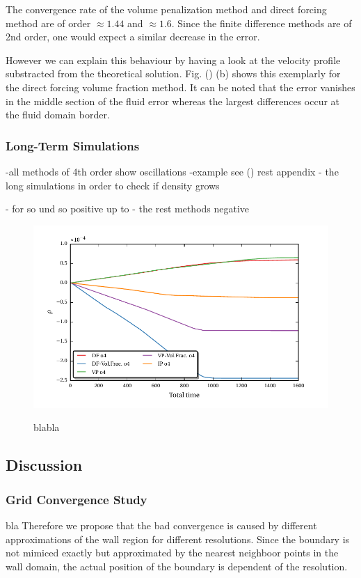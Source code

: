 The convergence rate of the volume penalization method and direct forcing method are of order $\approx 1.44$ and $\approx 1.6$.
Since the finite difference methods are of 2nd order, one would expect a similar decrease in the error.

However we can explain this behaviour by having a look at the velocity profile substracted from the theoretical solution.
Fig. () (b) shows this exemplarly for the direct forcing volume fraction method. It can be noted that
the error vanishes in the middle section of the fluid error whereas the largest differences occur at the fluid domain border.


\subsubsection{Long-Term Simulations}

-all methods of 4th order show oscillations
-example see () rest appendix
- the long simulations in order to check if density grows

- for so und so positive up to
- the rest methods negative



\begin{figure}
  \centering
  \includegraphics{gfx/immersed_boundary/hpflow/long/ts.pdf}\label{fig:hpflow_allgc_theo}
  \caption{blabla}
\end{figure}

\clearpage

\subsection{Discussion}
\subsubsection{Grid Convergence Study}
bla
Therefore we propose that the bad convergence is caused by different approximations of the wall region for different resolutions.
Since the boundary is not mimiced exactly but approximated by the nearest neighboor points in the wall domain, the actual position
of the boundary is dependent of the resolution.\\


